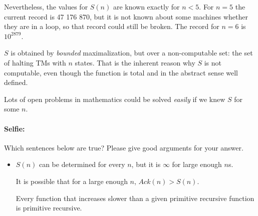 Nevertheless, the values for $S(n)$ are known exactly for $n <
5$. For $n = 5$ the current record is 47 176 870, but it is not known
about some machines whether they are in a loop, so that record could
still be broken. The record for $n = 6$ is $10^{2879}$.

$S$ is obtained by {\em bounded} maximalization, but over a
non-computable set: the set of halting TMs with $n$ states. That is
the inherent reason why $S$ is not computable, even though the
function is total and in the abstract sense well defined.

Lots of open problems in mathematics could be solved {\em easily} if
we knew $S$ for some $n$.


\paragraph{Selfie:} Which sentences below are true? Please give good arguments for your answer.

\begin{itemize}
\item[] $S(n)$ can be determined for every $n$, but it is $\infty$ for
  large enough $n$s.

It is possible that for a large enough $n$, $Ack(n) > S(n)$.

Every function that increases slower than a given primitive recursive
function is primitive recursive.
\end{itemize}

